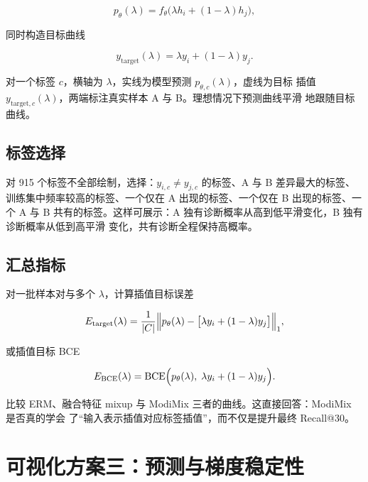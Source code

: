 \documentclass[11pt,a4paper]{article}
\theoremstyle{definition}
\begin{document}
\begin{equation}
  p_\theta(\lambda)=f_\theta\bigl(\lambda h_i+(1-\lambda)h_j\bigr),
  \label{eq:pred-curve}
\end{equation}

同时构造目标曲线

\begin{equation}
  y_{\text{target}}(\lambda)=\lambda y_i+(1-\lambda)y_j.
  \label{eq:target-curve}
\end{equation}

对一个标签 $c$，横轴为 $\lambda$，实线为模型预测 $p_{\theta,c}(\lambda)$，虚线为目标
插值 $y_{\text{target},c}(\lambda)$，两端标注真实样本 A 与 B。理想情况下预测曲线平滑
地跟随目标曲线。

\subsection{标签选择}

对 915 个标签不全部绘制，选择：$y_{i,c}\neq y_{j,c}$ 的标签、A 与 B 差异最大的标签、
训练集中频率较高的标签、一个仅在 A 出现的标签、一个仅在 B 出现的标签、一个 A 与 B
共有的标签。这样可展示：A 独有诊断概率从高到低平滑变化，B 独有诊断概率从低到高平滑
变化，共有诊断全程保持高概率。

\subsection{汇总指标}

对一批样本对与多个 $\lambda$，计算插值目标误差

\begin{equation}
  E_{\text{target}}(\lambda)
  =\frac{1}{|C|}\Bigl\lVert
    p_\theta(\lambda)-\bigl[\lambda y_i+(1-\lambda)y_j\bigr]
  \Bigr\rVert_1,
  \label{eq:target-error}
\end{equation}

或插值目标 BCE

\begin{equation}
  E_{\text{BCE}}(\lambda)
  =\mathrm{BCE}\Bigl(p_\theta(\lambda),\;\lambda y_i+(1-\lambda)y_j\Bigr).
  \label{eq:target-bce}
\end{equation}

比较 ERM、融合特征 mixup 与 ModiMix 三者的曲线。这直接回答：ModiMix 是否真的学会
了“输入表示插值对应标签插值”，而不仅是提升最终 Recall@30。

\section{可视化方案三：预测与梯度稳定性}
\label{sec:vis-gradient}
\end{document}
